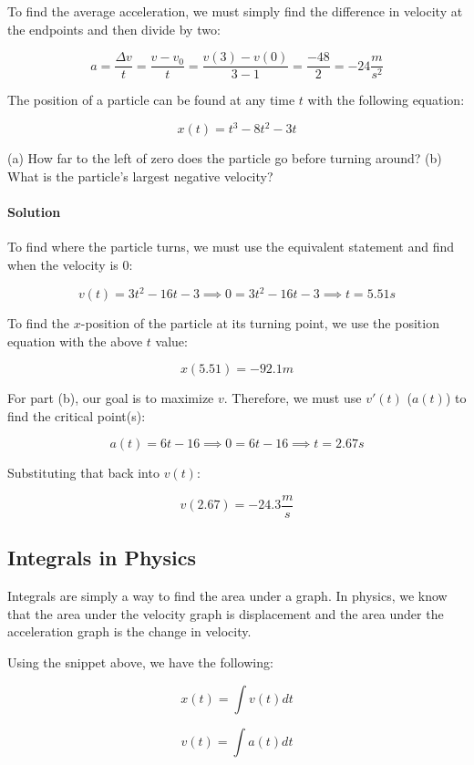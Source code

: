 \documentclass{scrartcl}
\theoremstyle{definition}
\begin{document}
	\noindent To find the average acceleration, we must simply find the difference in velocity at the endpoints and then divide by two:
	
	$$
	a = \frac{\Delta v}{t} = \frac{v-v_0}{t} = \frac{v(3) - v(0)}{3-1} = \frac{-48}{2} = -24 \frac{m}{s^2}
	$$
	
	\begin{example}
		The position of a particle can be found at any time $t$ with the following equation:
	
		$$
		x(t) = t^3 - 8t^2 - 3t
		$$
		
		\noindent (a) How far to the left of zero does the particle go before turning around? (b) What is the particle's largest negative velocity?
	\end{example}
	
	\paragraph{Solution} To find where the particle turns, we must use the equivalent statement and find when the velocity is $0$:
	
	$$
	v(t) = 3t^2-16t-3 \implies 0 =3t^2-16t-3 \implies t = 5.51s
	$$
	
	\noindent To find the $x$-position of the particle at its turning point, we use the position equation with the above $t$ value:
	
	$$
	x(5.51) = -92.1m
	$$
	
	\noindent For part (b), our goal is to maximize $v$. Therefore, we must use $v'(t)$ ($a(t)$) to find the critical point(s):
	
	$$
	a(t) = 6t - 16 \implies 0 = 6t - 16 \implies t = 2.67s
	$$
	
	\noindent Substituting that back into $v(t)$:
	
	$$
	v(2.67) = -24.3 \frac{m}{s}
	$$
	
	\subsection{Integrals in Physics}
	
	Integrals are simply a way to find the area under a graph. In physics, we know that the area under the velocity graph is displacement and the area under the acceleration graph is the change in velocity.
	
	\begin{theorem}
			Using the snippet above, we have the following:
			
			$$
			x(t) = \int v(t) dt 
			$$
			
			$$
			v(t) = \int a(t)dt
			$$
	\end{theorem}
	
\end{document}
